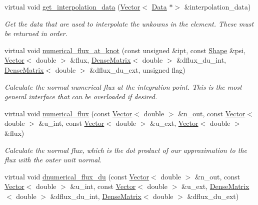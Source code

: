 \begin{DoxyCompactItemize}
virtual void \hyperlink{classoomph_1_1DGFaceElement_ad0987fa163b40067f8d11c7edaf4af32}{get\+\_\+interpolation\+\_\+data} (\hyperlink{classoomph_1_1Vector}{Vector}$<$ \hyperlink{classoomph_1_1Data}{Data} $\ast$$>$ \&interpolation\+\_\+data)
\begin{DoxyCompactList}\small\item\em Get the data that are used to interpolate the unkowns in the element. These must be returned in order. \end{DoxyCompactList}\item 
virtual void \hyperlink{classoomph_1_1DGFaceElement_ab75e12cd6a07fac5daabb122ffa29429}{numerical\+\_\+flux\+\_\+at\+\_\+knot} (const unsigned \&ipt, const \hyperlink{classoomph_1_1Shape}{Shape} \&psi, \hyperlink{classoomph_1_1Vector}{Vector}$<$ double $>$ \&flux, \hyperlink{classoomph_1_1DenseMatrix}{Dense\+Matrix}$<$ double $>$ \&dflux\+\_\+du\+\_\+int, \hyperlink{classoomph_1_1DenseMatrix}{Dense\+Matrix}$<$ double $>$ \&dflux\+\_\+du\+\_\+ext, unsigned flag)
\begin{DoxyCompactList}\small\item\em Calculate the normal numerical flux at the integration point. This is the most general interface that can be overloaded if desired. \end{DoxyCompactList}\item 
virtual void \hyperlink{classoomph_1_1DGFaceElement_a023e05bcee73952fbc2c1f816a0a0860}{numerical\+\_\+flux} (const \hyperlink{classoomph_1_1Vector}{Vector}$<$ double $>$ \&n\+\_\+out, const \hyperlink{classoomph_1_1Vector}{Vector}$<$ double $>$ \&u\+\_\+int, const \hyperlink{classoomph_1_1Vector}{Vector}$<$ double $>$ \&u\+\_\+ext, \hyperlink{classoomph_1_1Vector}{Vector}$<$ double $>$ \&flux)
\begin{DoxyCompactList}\small\item\em Calculate the normal flux, which is the dot product of our approximation to the flux with the outer unit normal. \end{DoxyCompactList}\item 
virtual void \hyperlink{classoomph_1_1DGFaceElement_aa905f22c530f3f640373eccbe90874b8}{dnumerical\+\_\+flux\+\_\+du} (const \hyperlink{classoomph_1_1Vector}{Vector}$<$ double $>$ \&n\+\_\+out, const \hyperlink{classoomph_1_1Vector}{Vector}$<$ double $>$ \&u\+\_\+int, const \hyperlink{classoomph_1_1Vector}{Vector}$<$ double $>$ \&u\+\_\+ext, \hyperlink{classoomph_1_1DenseMatrix}{Dense\+Matrix}$<$ double $>$ \&dflux\+\_\+du\+\_\+int, \hyperlink{classoomph_1_1DenseMatrix}{Dense\+Matrix}$<$ double $>$ \&dflux\+\_\+du\+\_\+ext)
$$
\end{DoxyCompactItemize}
